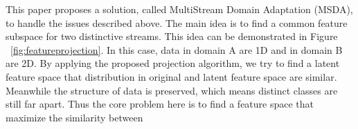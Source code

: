 This paper proposes a solution, called MultiStream Domain Adaptation (MSDA), to handle the issues described above. The
main idea is to find a common feature subspace for two distinctive streams. This idea can
be demonstrated in Figure ~\ref{fig:featureprojection}. In this case, data in domain A are 1D and in domain B are 2D. By applying the proposed projection algorithm, we
try to find a latent feature space that distribution in original and latent feature space are similar. 
Meanwhile the structure of data is preserved, which means distinct classes are still far apart.
Thus the core problem here is to find a feature space that maximize the similarity between 



